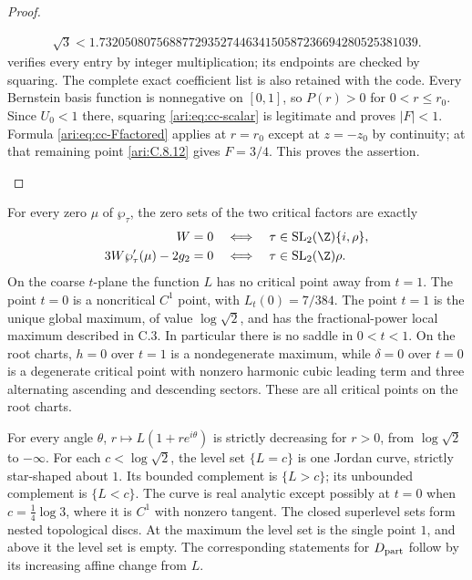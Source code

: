 \begin{proof}
\begin{enumerate}[label=\arabic*.,leftmargin=*]
\[\begin{gathered}
 \sqrt3<1.73205080756887729352744634150587236694280525381039.
 \end{gathered}
\]
verifies every entry by integer multiplication; its endpoints
are checked by squaring. The complete exact coefficient list is
also retained with the code. Every Bernstein basis function is
nonnegative on $[0,1]$, so $P(r)>0$ for $0<r\le r_0$.
Since $U_0<1$ there, squaring \eqref{ari:eq:cc-scalar} is legitimate
and proves $|F|<1$. Formula \eqref{ari:eq:cc-Ffactored} applies
at $r=r_0$ except at $z=-z_0$ by continuity; at that remaining
point \ref{ari:C.8.12} gives $F=3/4$. This proves the assertion.
\end{enumerate}
\end{proof}

\begin{proposition}\hypertarget{tag-001P}{}\label{ari:C.8.15}

For every zero $\mu$ of $\wp_\tau$, the zero sets of the two
critical factors are exactly
\[
 \begin{aligned}
 W=0&\quad\Longleftrightarrow\quad
       \tau\in\operatorname{SL}_2(\Z)\{i,\rho\},\\
 3W\wp'_\tau(\mu)-2g_2=0&\quad\Longleftrightarrow\quad
       \tau\in\operatorname{SL}_2(\Z)\rho.
 \end{aligned}
\]
On the coarse $t$-plane the function $L$ has no critical point
away from $t=1$. The point $t=0$ is a noncritical $C^1$ point,
with $L_t(0)=7/384$. The point $t=1$ is the unique global
maximum, of value $\log\sqrt2$, and has the fractional-power
local maximum described in C.3. In particular there is no
saddle in $0<t<1$. On the root charts, $h=0$ over $t=1$
is a nondegenerate maximum, while $\delta=0$ over $t=0$
is a degenerate critical point with nonzero harmonic cubic
leading term and three alternating ascending and descending
sectors. These are all critical points on the root charts.

For every angle $\theta$, $r\mapsto L(1+re^{i\theta})$ is
strictly decreasing for $r>0$, from $\log\sqrt2$ to $-\infty$.
For each $c<\log\sqrt2$, the level set $\{L=c\}$ is one
Jordan curve, strictly star-shaped about $1$. Its bounded
complement is $\{L>c\}$; its unbounded complement is
$\{L<c\}$. The curve is real analytic except possibly at
$t=0$ when $c=\frac14\log3$, where it is $C^1$ with nonzero
tangent. The closed superlevel sets form nested topological
discs. At the maximum the level set is the single point $1$,
and above it the level set is empty. The corresponding
statements for $D_{\rm part}$ follow by its increasing affine
change from $L$.
\end{proposition}


